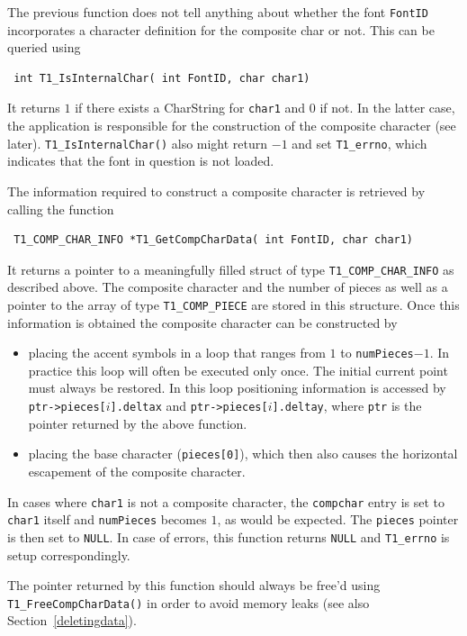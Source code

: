 The previous function does not tell anything about whether the font
\verb+FontID+ incorporates a character definition for the composite char or
not. This can be queried using
\precorr
\begin{verbatim}
 int T1_IsInternalChar( int FontID, char char1)
\end{verbatim}\postcorr
It returns $1$ if there exists a CharString for \verb+char1+ and $0$ if not.
In the latter case, the application is responsible for the construction of the
composite character (see later). \verb+T1_IsInternalChar()+ also might return
$-1$ and set \verb+T1_errno+, which indicates that the font in question is not
loaded. 

The information required to construct a composite character is retrieved by
calling the function
\precorr
\begin{verbatim}
 T1_COMP_CHAR_INFO *T1_GetCompCharData( int FontID, char char1)
\end{verbatim}\postcorr
It returns a pointer to a meaningfully filled struct of type
\verb+T1_COMP_CHAR_INFO+ as described above. The composite character and the
number 
of pieces as well as a pointer to the array of type \verb+T1_COMP_PIECE+ are
stored in this structure. Once this information is obtained the composite
character can be constructed by
\begin{itemize}
\item placing the accent symbols in a loop that ranges from $1$ to
  \verb+numPieces+$-1$. In practice this loop will often be executed only
  once. The initial current point must always be restored. In this loop
  positioning information is accessed by \verb+ptr->pieces[+$i$\verb+].deltax+
  and \verb+ptr->pieces[+$i$\verb+].deltay+, where \verb+ptr+ is the pointer
  returned by the above function.
\item placing the base character (\verb+pieces[0]+), which then also causes
  the horizontal escapement of the composite character. 
\end{itemize}

In cases where \verb+char1+ is not a composite
character, the \verb+compchar+ entry is set to \verb+char1+ itself and
\verb+numPieces+ becomes $1$, as would be expected. The \verb+pieces+ pointer
is then set to \verb+NULL+. In case of errors, this function returns
\verb+NULL+ and \verb+T1_errno+ is setup correspondingly.

The pointer returned by this function should always be free'd  using
\verb+T1_FreeCompCharData()+ in order to avoid memory leaks (see also
Section~\ref{deletingdata}).

